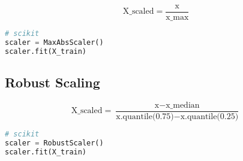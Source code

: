 \[\text{X\_scaled} = \frac{\text{x}}{\text{x\_max}}\]

\begin{lstlisting}[language=Python]
# scikit
scaler = MaxAbsScaler()
scaler.fit(X_train)
\end{lstlisting}

\subsection{Robust Scaling}

\[\text{X\_scaled} = \frac{\text{x} - \text{x\_median}}{\text{x.quantile(0.75)} - \text{x.quantile(0.25)}}\]

\begin{lstlisting}[language=Python]
# scikit
scaler = RobustScaler()
scaler.fit(X_train)
\end{lstlisting}

\newpage